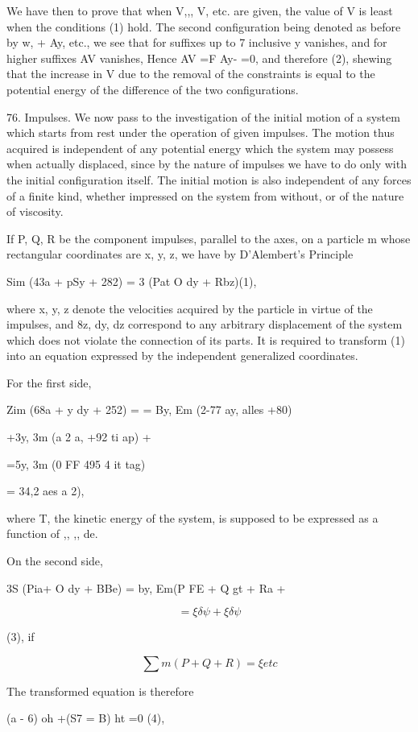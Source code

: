We have then to prove that when V,,, V, etc. are given, the value of V is least
when the conditions (1) hold. The second configuration being denoted as before
by w, + Ay, etc., we see that for suffixes up to 7 inclusive y vanishes, and
for higher suffixes AV vanishes, Hence AV =F Ay- =0, and therefore (2), shewing
that the increase in V due to the removal of the constraints is equal to the
potential energy of the difference of the two configurations.

76. Impulses. We now pass to the investigation of the initial motion of a system which
starts from rest under the operation of given impulses. The motion thus
acquired is independent of any potential energy which the system may possess
when actually displaced, since by the nature of impulses we have to do only
with the initial configuration itself. The initial motion is also independent
of any forces of a finite kind, whether impressed on the system from without,
or of the nature of viscosity.

If P, Q, R be the component impulses, parallel to the axes, on a particle m
whose rectangular coordinates are x, y, z, we have by D'Alembert's Principle

Sim (43a + pSy + 282) = 3 (Pat O dy + Rbz)(1),

where x, y, z denote the velocities acquired by the particle in virtue of the
impulses, and 8z, dy, dz correspond to any arbitrary displacement of the system
which does not violate the connection of its parts. It is required to transform
(1) into an equation expressed by the independent generalized coordinates.

For the first side,

Zim (68a + y dy + 252) = = By, Em (2-77 ay, alles +80)

+3y, 3m (a 2 a, +92 ti ap) +

=5y, 3m (0 FF 495 4 it tag)

= 34,2 aes a 2),

where T, the kinetic energy of the system, is supposed to be expressed as a
function of ,, ,, de.

On the second side,

3S (Pia+ O dy + BBe) = by, Em(P FE + Q gt + Ra +

\[=  \xi  \delta \psi + \xi  \delta \psi\]

(3), if

\[\sum m (P+Q+R) = \xi etc\]

The transformed equation is therefore

(a - 6) oh +(S7 = B) ht =0 (4),

